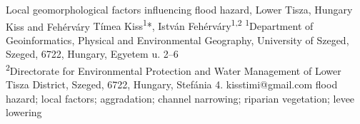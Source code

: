 \abstract
{Local geomorphological factors influencing flood hazard, Lower Tisza, Hungary} 
{Kiss and Fehérváry} 
{Tímea Kiss\textsuperscript{1}*, István Fehérváry\textsuperscript{1,2}} 
{\TLtag} 
{
\textsuperscript{1}Department of Geoinformatics, Physical and Environmental Geography, University of Szeged, Szeged, 6722, Hungary, Egyetem u. 2–6\\
\textsuperscript{2}Directorate for Environmental Protection and Water Management of Lower Tisza District,
	Szeged, 6722, Hungary, Stefánia 4.
}
{kisstimi@gmail.com}  %
{flood hazard; local factors; aggradation; channel narrowing; riparian vegetation; levee lowering}
